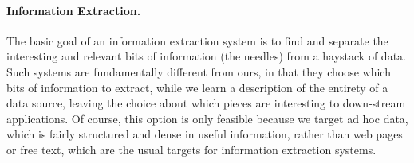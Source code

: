 

\paragraph*{Information Extraction.}

The basic goal of an information extraction system is to find and
separate the interesting and relevant bits of information (the
needles) from a haystack of data.  Such systems are fundamentally
different from ours, in that they choose which bits of information to
extract, while we learn a description of the entirety of a data
source, leaving the choice about which pieces are interesting to
down-stream applications.  Of course, this option is only feasible
because we target ad hoc data, which is fairly structured and dense in
useful information, rather than web pages or free text, which are the
usual targets for information extraction systems. 

